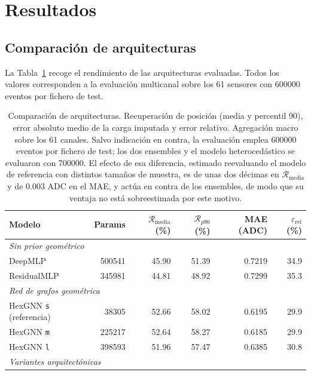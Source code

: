 \section{Resultados}
\label{sec:resultados}

\subsection{Comparación de arquitecturas}
\label{subsec:res-arquitecturas}

La Tabla~\ref{tab:res-arquitecturas} recoge el rendimiento de las arquitecturas evaluadas. Todos los
valores corresponden a la evaluación multicanal sobre los 61 sensores con \num{600000} eventos por
fichero de test.

\begin{table}[htbp]
\centering
\caption{Comparación de arquitecturas. Recuperación de posición (media y percentil 90),
error absoluto medio de la carga imputada y error relativo. Agregación macro sobre los 61 canales.
Salvo indicación en contra, la evaluación emplea \num{600000} eventos por fichero de test; los dos
ensembles y el modelo heterocedástico se evaluaron con \num{700000}. El efecto de esa diferencia,
estimado reevaluando el modelo de referencia con distintos tamaños de muestra, es de unas dos
décimas en $\mathcal{R}_{\text{media}}$ y de $0.003$ ADC en el MAE, y actúa en contra de los
ensembles, de modo que su ventaja no está sobreestimada por este motivo.}
\label{tab:res-arquitecturas}
\small
\begin{tabular}{lrrrrr}
\toprule
\textbf{Modelo} & \textbf{Params} & $\mathcal{R}_{\text{media}}$ (\%) & $\mathcal{R}_{p90}$ (\%) &
\textbf{MAE} (ADC) & $\varepsilon_{\text{rel}}$ (\%) \\
\midrule
\multicolumn{6}{l}{\emph{Sin prior geométrico}} \\
\quad DeepMLP & \num{500541} & 45.90 & 51.39 & 0.7219 & 34.9 \\
\quad ResidualMLP & \num{345981} & 44.81 & 48.92 & 0.7299 & 35.3 \\
\midrule
\multicolumn{6}{l}{\emph{Red de grafos geométrica}} \\
\quad HexGNN \texttt{s} (referencia) & \num{38305} & 52.66 & 58.02 & 0.6195 & 29.9 \\
\quad HexGNN \texttt{m} & \num{225217} & 52.64 & 58.27 & 0.6185 & 29.9 \\
\quad HexGNN \texttt{l} & \num{398593} & 51.96 & 57.47 & 0.6385 & 30.8 \\
\midrule
\multicolumn{6}{l}{\emph{Variantes arquitectónicas}} \\

\end{tabular}
\end{table}

